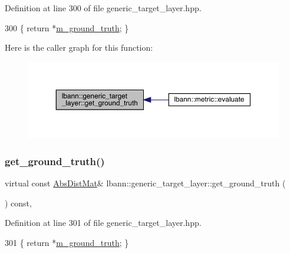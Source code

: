 Definition at line 300 of file generic\+\_\+target\+\_\+layer.\+hpp.


\begin{DoxyCode}
300 \{ \textcolor{keywordflow}{return} *\hyperlink{classlbann_1_1generic__target__layer_acb9ba351caf22b8e2378e4cd1e256da7}{m\_ground\_truth}; \}
\end{DoxyCode}
Here is the caller graph for this function\+:\nopagebreak
\begin{figure}[H]
\begin{center}
\leavevmode
\includegraphics[width=350pt]{classlbann_1_1generic__target__layer_a9cbe476f3e447bc91e2834921ca7da9f_icgraph}
\end{center}
\end{figure}
\mbox{\label{classlbann_1_1generic__target__layer_a073c3ea648d5ba040e3a4acaa1dcf480}} 
\subsubsection{\texorpdfstring{get\+\_\+ground\+\_\+truth()}{get\_ground\_truth()}\hspace{0.1cm}{\footnotesize\ttfamily [2/2]}}
{\footnotesize\ttfamily virtual const \hyperlink{base_8hpp_a9a697a504ae84010e7439ffec862b470}{Abs\+Dist\+Mat}\& lbann\+::generic\+\_\+target\+\_\+layer\+::get\+\_\+ground\+\_\+truth (\begin{DoxyParamCaption}{ }\end{DoxyParamCaption}) const\hspace{0.3cm}{\ttfamily [inline]}, {\ttfamily [virtual]}}



Definition at line 301 of file generic\+\_\+target\+\_\+layer.\+hpp.


\begin{DoxyCode}
301 \{ \textcolor{keywordflow}{return} *\hyperlink{classlbann_1_1generic__target__layer_acb9ba351caf22b8e2378e4cd1e256da7}{m\_ground\_truth}; \}
\end{DoxyCode}
\mbox{\label{classlbann_1_1generic__target__layer_a0325a9703238ac0120893214fd0983b5}} 
